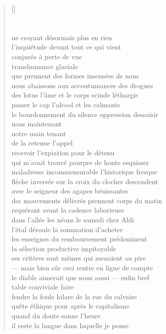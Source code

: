 \documentclass[a4paper, titlepage, twoside, 12pt]{book}
\begin{document}
\begin{verse}[\versewidth]
\section*{}
ne croyant désormais plus en rien\\
l'inquiétude devant tout ce qui vient\\
conjurée à perte de vue\\
transhumance glaciale\\
que prennent des formes insensées de nous\\
nous abaissons aux accoutumances des drogues\\
des lotus l'âme et le corps scinde léthargie\\
passer le cap l'alcool et les calmants\\
le bourdonnement du silence oppression dessaisir\\
nous maintenant\\
notre main tenant\\
de la retenue l'appel\\
recevoir l'expiation pour le détenu\\
qui m'avait trouvé pourpre de honte esquisser\\
maladresse incommensurable l'historique fresque\\
flèche inversée sur la croix du clocher descendent\\
avec le seigneur des agapes bénissantes\\
des mouvements délivrés prennent corps du matin\\
requérant avant la cadence laborieuse\\
dans l'allée les  néons le samedi chez Aldi\\
l'étal déroule la sommation d'acheter\\
les enseignes du remboursement prédominent\\
la sélection productive impitoyable\\
ses critères sont mêmes qui menaient au pire\\
--- mais bien sûr ceci rentre en ligne de compte\\
le diable aimerait que nous aussi --- enfin bref\\
table conviviale faire\\
fendre la foule hilare de la rue du calvaire\\
quête éthique pour après le capitalisme\\  
quand du doute sonne l'heure\\
il reste la langue dans laquelle je pense\\

\end{verse}
\end{document}
